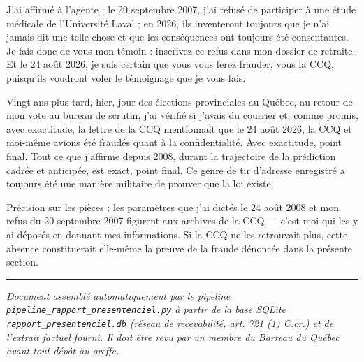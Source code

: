 \documentclass[12pt,letterpaper,oneside]{article}
\begin{document}
J'ai affirmé à l'agente : le 20 septembre 2007, j'ai refusé de participer à
une étude médicale de l'Université Laval ; en 2026, ils inventeront toujours
que je n'ai jamais dit une telle chose et que les conséquences ont toujours
été consentantes. Je fais donc de vous mon témoin : inscrivez ce refus dans
mon dossier de retraite. Et le 24 août 2026, je suis certain que vous vous
ferez frauder, vous la CCQ, puisqu'ils voudront voler le témoignage que je
vous fais.

Vingt ans plus tard, hier, jour des élections provinciales au Québec, au
retour de mon vote au bureau de scrutin, j'ai vérifié si j'avais du courrier
et, comme promis, avec exactitude, la lettre de la CCQ mentionnait que le
24 août 2026, la CCQ et moi-même avions été fraudés quant à la
confidentialité. Avec exactitude, point final. Tout ce que j'affirme depuis
2008, durant la trajectoire de la prédiction cadrée et anticipée, est exact,
point final. Ce genre de tir d'adresse enregistré a toujours été une manière
militaire de prouver que la loi existe.

Précision sur les pièces : les paramètres que j'ai dictés le 24 août 2008 et
mon refus du 20 septembre 2007 figurent aux archives de la CCQ — c'est moi
qui les y ai déposés en donnant mes informations. Si la CCQ ne les retrouvait
plus, cette absence constituerait elle-même la preuve de la fraude
dénoncée dans la présente section.


\vspace{0.8cm}
\hrule
\vspace{0.4em}
\small\emph{Document assemblé automatiquement par le pipeline \texttt{pipeline\_rapport\_presentenciel.py} à partir de la base SQLite \texttt{rapport\_presentenciel.db} (réseau de recevabilité, art. 721 (1) C.cr.) et de l'extrait factuel fourni. Il doit être revu par un membre du Barreau du Québec avant tout dépôt au greffe.}
\end{document}
